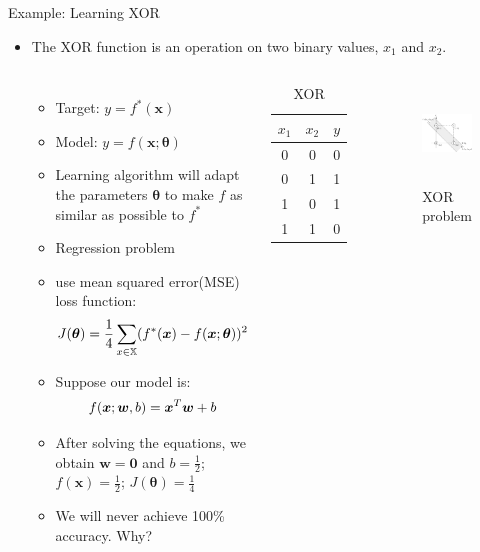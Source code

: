 \documentclass[10pt]{beamer}
\begin{document}
	\begin{frame}{Example: Learning XOR}
		\begin{itemize}
			\item The XOR function is an operation on two binary values, $x_1$ and $x_2$.
			\begin{columns}[T,onlytextwidth]
				\begin{itemize}
					\item Target: $y=f^*(\bm{x})$
					\item Model: $y=f(\bm{x};\bm{\theta})$
					\item Learning algorithm will adapt the parameters $\bm{\theta}$ to make $f$ as similar as possible to $f^*$
					\item Regression problem
					\item use mean squared error(MSE) loss function:
					\begin{equation*}
						\vspace{-1em}
						J(\bm{\theta})=\frac{1}{4}\sum_{x\in\mathbb{X}}(f^*(\bm{x})-f(\bm{x};\bm{\theta}))^2
						\vspace{-0.5em}
					\end{equation*}
					\item Suppose our model is:
					\begin{equation*}
						\vspace{-1em}
						f(\bm{x};\bm{w},b)=\bm{x}^T\bm{w}+b
						\vspace{-0.5em}
					\end{equation*}
					\item After solving the equations, we obtain $\bm{w}=\bm{0}$ and $b=\frac{1}{2}$; $f(\bm{x})=\frac{1}{2}$; $J(\bm{\theta})=\frac{1}{4}$
					\item We will never achieve 100\% accuracy. Why?
				\end{itemize}
				\vspace{-1em}
				\begin{table}
					\caption{XOR}
					\begin{tabular}{c c|c}
						\hline
						$x_1$ & $x_2$ & $y$ \\
						\hline
						0 & 0 & 0 \\
						0 & 1 & 1 \\
						1 & 0 & 1 \\
						1 & 1 & 0 \\
						\hline
					\end{tabular}
				\end{table}
				\begin{figure}
					\caption{XOR problem}
					\includegraphics[height=7em]{figures/XOR.png}
				\end{figure}
			\end{columns}
		\end{itemize}
	\end{frame}
\end{document}
